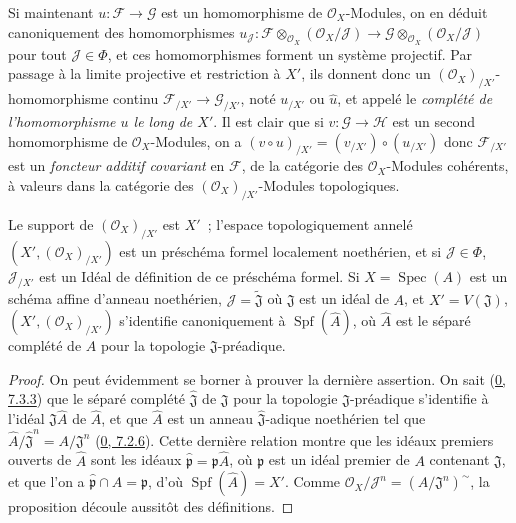 Si maintenant $u:\mathscr{F}\to\mathscr{G}$ est un homomorphisme de
$\mathscr{O}_X$-Modules, on en déduit canoniquement des homomorphismes
$u_{\mathscr{J}}:
\mathscr{F}\otimes_{\mathscr{O}_X}(\mathscr{O}_X/\mathscr{J})
\to
\mathscr{G}\otimes_{\mathscr{O}_X}(\mathscr{O}_X/\mathscr{J})$
pour tout $\mathscr{J}\in\Phi$, et ces homomorphismes forment un système
projectif. Par passage à la limite projective et restriction à $X'$, ils
donnent donc un $(\mathscr{O}_X)_{/X'}$-homomorphisme continu
$\mathscr{F}_{/X'}\to\mathscr{G}_{/X'}$, noté $u_{/X'}$ ou $\widehat u$,
et appelé le \emph{complété de l'homomorphisme $u$ le long de $X'$}. Il est
clair que si $v:\mathscr{G}\to\mathscr{H}$ est un second homomorphisme de
$\mathscr{O}_X$-Modules, on a
$(v\circ u)_{/X'}=(v_{/X'})\circ(u_{/X'})$ donc
$\mathscr{F}_{/X'}$ est un \emph{foncteur additif covariant} en
$\mathscr{F}$, de la catégorie des $\mathscr{O}_X$-Modules cohérents, à
valeurs dans la catégorie des $(\mathscr{O}_X)_{/X'}$-Modules topologiques.

\begin{proposition}[10.8.5]
\label{I.10.8.5-fr}
Le support de $(\mathscr{O}_X)_{/X'}$ est $X'$~; l'espace topologiquement
annelé $(X',(\mathscr{O}_X)_{/X'})$ est un préschéma formel localement
noethérien, et si $\mathscr{J}\in\Phi$, $\mathscr{J}_{/X'}$ est un Idéal de
définition de ce préschéma formel. Si $X=\operatorname{Spec}(A)$ est un
schéma affine d'anneau noethérien, $\mathscr{J}=\widetilde{\mathfrak{J}}$
où $\mathfrak{J}$ est un idéal de $A$, et $X'=V(\mathfrak{J})$,
$(X',(\mathscr{O}_X)_{/X'})$ s'identifie canoniquement à
$\operatorname{Spf}(\widehat A)$, où $\widehat A$ est le séparé complété de
$A$ pour la topologie $\mathfrak{J}$-préadique.
\end{proposition}

\begin{proof}
On peut évidemment se borner à prouver la dernière assertion. On sait
(\hyperref[0.7.3.3-fr]{0, 7.3.3}) que le séparé complété
$\widehat{\mathfrak{J}}$ de $\mathfrak{J}$ pour la topologie
$\mathfrak{J}$-préadique s'identifie à l'idéal
$\mathfrak{J}\widehat A$ de $\widehat A$, et que $\widehat A$ est un anneau
$\widehat{\mathfrak{J}}$-adique noethérien tel que
$\widehat A/\widehat{\mathfrak{J}}^n=A/\mathfrak{J}^n$
(\hyperref[0.7.2.6-fr]{0, 7.2.6}). Cette dernière relation montre que les
idéaux premiers ouverts de $\widehat A$ sont les idéaux
$\widehat{\mathfrak p}=\mathfrak p\widehat A$, où $\mathfrak p$ est un
idéal premier de $A$ contenant $\mathfrak{J}$, et que l'on a
$\widehat{\mathfrak p}\cap A=\mathfrak p$, d'où
$\operatorname{Spf}(\widehat A)=X'$. Comme
$\mathscr{O}_X/\mathscr{J}^n=(A/\mathfrak{J}^n)^{\sim}$, la proposition
découle aussitôt des définitions.
\end{proof}


